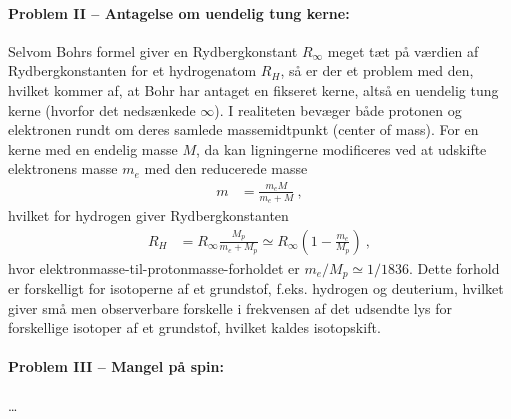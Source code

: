 \paragraph{Problem II -- Antagelse om uendelig tung kerne:} Selvom Bohrs formel giver en Rydbergkonstant $R_\infty$ meget tæt på værdien af Rydbergkonstanten for et hydrogenatom $R_H$, så er der et problem med den, hvilket kommer af, at Bohr har antaget en fikseret kerne, altså en uendelig tung kerne (hvorfor det nedsænkede $\infty$). I realiteten bevæger både protonen og elektronen rundt om deres samlede massemidtpunkt (center of mass). For en kerne med en endelig masse $M$, da kan ligningerne modificeres ved at udskifte elektronens masse $m_e$ med den reducerede masse
\begin{align}
    m &= \frac{m_e M}{m_e + M} \: ,
\end{align}
hvilket for hydrogen giver Rydbergkonstanten
\begin{align}
    R_H &= R_\infty \frac{M_p}{m_e + M_p} \simeq R_\infty \left(1 - \frac{m_e}{M_p}\right) \: ,
\end{align}
hvor elektronmasse-til-protonmasse-forholdet er $m_e/M_p \simeq 1/1836$. Dette forhold er forskelligt for isotoperne af et grundstof, f.eks. hydrogen og deuterium, hvilket giver små men observerbare forskelle i frekvensen af det udsendte lys for forskellige isotoper af et grundstof, hvilket kaldes isotopskift.


\paragraph{Problem III -- Mangel på spin:} \ldots